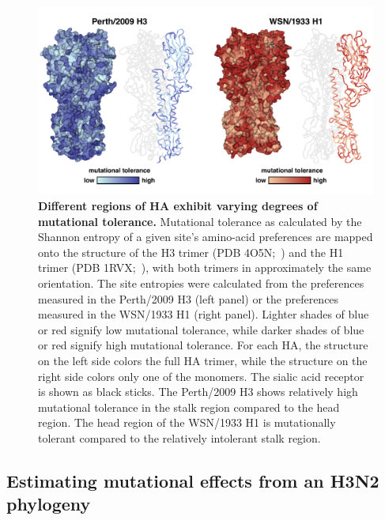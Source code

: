 \documentclass[11pt]{article}
\begin{document}
\begin{figure}
\centerline{\includegraphics[width=\textwidth]{figs/mut_tolerance/entropy_heatmap.pdf}}
\caption{\label{fig:mut_tolerance}
{\bf Different regions of HA exhibit varying degrees of mutational tolerance.}
Mutational tolerance as calculated by the Shannon entropy of a given site's amino-acid preferences are mapped onto the structure of the H3 trimer (PDB 4O5N;~\cite{lee2014receptor}) and the H1 trimer (PDB 1RVX;~\cite{gamblin2004structure}), with both trimers in approximately the same orientation. 
The site entropies were calculated from the preferences measured in the Perth/2009 H3 (left panel) or the preferences measured in the WSN/1933 H1 (right panel). 
Lighter shades of blue or red signify low mutational tolerance, while darker shades of blue or red signify high mutational tolerance. 
For each HA, the structure on the left side colors the full HA trimer, while the structure on the right side colors only one of the monomers.
The sialic acid receptor is shown as black sticks.
The Perth/2009 H3 shows relatively high mutational tolerance in the stalk region compared to the head region. 
The head region of the WSN/1933 H1 is mutationally tolerant compared to the relatively intolerant stalk region. 
}
\end{figure}

\subsection*{Estimating mutational effects from an H3N2 phylogeny}
\end{document}
